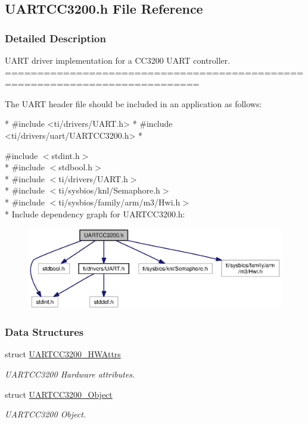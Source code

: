 \subsection{U\-A\-R\-T\-C\-C3200.\-h File Reference}
\label{_u_a_r_t_c_c3200_8h}


\subsubsection{Detailed Description}
U\-A\-R\-T driver implementation for a C\-C3200 U\-A\-R\-T controller. ============================================================================

The U\-A\-R\-T header file should be included in an application as follows\-: 
\begin{DoxyCode}
*  #include <ti/drivers/UART.h>
*  #include <ti/drivers/uart/UARTCC3200.h>
*  
\end{DoxyCode}
 

{\ttfamily \#include $<$stdint.\-h$>$}\\*
{\ttfamily \#include $<$stdbool.\-h$>$}\\*
{\ttfamily \#include $<$ti/drivers/\-U\-A\-R\-T.\-h$>$}\\*
{\ttfamily \#include $<$ti/sysbios/knl/\-Semaphore.\-h$>$}\\*
{\ttfamily \#include $<$ti/sysbios/family/arm/m3/\-Hwi.\-h$>$}\\*
Include dependency graph for U\-A\-R\-T\-C\-C3200.\-h\-:
\nopagebreak
\begin{figure}[H]
\begin{center}
\leavevmode
\includegraphics[width=350pt]{_u_a_r_t_c_c3200_8h__incl}
\end{center}
\end{figure}
\subsubsection*{Data Structures}
\begin{DoxyCompactItemize}
\item 
struct \hyperlink{struct_u_a_r_t_c_c3200___h_w_attrs}{U\-A\-R\-T\-C\-C3200\-\_\-\-H\-W\-Attrs}
\begin{DoxyCompactList}\small\item\em U\-A\-R\-T\-C\-C3200 Hardware attributes. \end{DoxyCompactList}\item 
struct \hyperlink{struct_u_a_r_t_c_c3200___object}{U\-A\-R\-T\-C\-C3200\-\_\-\-Object}
\begin{DoxyCompactList}\small\item\em U\-A\-R\-T\-C\-C3200 Object. \end{DoxyCompactList}\end{DoxyCompactItemize}
